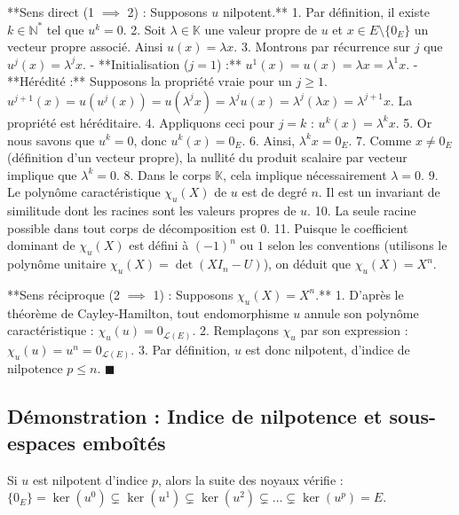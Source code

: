 \documentclass[11pt,a4paper]{article}
\begin{document}
**Sens direct (1 $\implies$ 2) : Supposons $u$ nilpotent.**
1. Par définition, il existe $k \in \mathbb{N}^*$ tel que $u^k = 0$.
2. Soit $\lambda \in \mathbb{K}$ une valeur propre de $u$ et $x \in E \setminus \{0_E\}$ un vecteur propre associé. Ainsi $u(x) = \lambda x$.
3. Montrons par récurrence sur $j$ que $u^j(x) = \lambda^j x$.
   - **Initialisation ($j=1$) :** $u^1(x) = u(x) = \lambda x = \lambda^1 x$.
   - **Hérédité :** Supposons la propriété vraie pour un $j \ge 1$. $u^{j+1}(x) = u(u^j(x)) = u(\lambda^j x) = \lambda^j u(x) = \lambda^j (\lambda x) = \lambda^{j+1} x$. La propriété est héréditaire.
4. Appliquons ceci pour $j=k$ : $u^k(x) = \lambda^k x$.
5. Or nous savons que $u^k = 0$, donc $u^k(x) = 0_E$.
6. Ainsi, $\lambda^k x = 0_E$.
7. Comme $x \neq 0_E$ (définition d'un vecteur propre), la nullité du produit scalaire par vecteur implique que $\lambda^k = 0$.
8. Dans le corps $\mathbb{K}$, cela implique nécessairement $\lambda = 0$.
9. Le polynôme caractéristique $\chi_u(X)$ de $u$ est de degré $n$. Il est un invariant de similitude dont les racines sont les valeurs propres de $u$.
10. La seule racine possible dans tout corps de décomposition est $0$.
11. Puisque le coefficient dominant de $\chi_u(X)$ est défini à $(-1)^n$ ou $1$ selon les conventions (utilisons le polynôme unitaire $\chi_u(X) = \det(XI_n - U)$), on déduit que $\chi_u(X) = X^n$.

**Sens réciproque (2 $\implies$ 1) : Supposons $\chi_u(X) = X^n$.**
1. D'après le théorème de Cayley-Hamilton, tout endomorphisme $u$ annule son polynôme caractéristique : $\chi_u(u) = 0_{\mathcal{L}(E)}$.
2. Remplaçons $\chi_u$ par son expression : $\chi_u(u) = u^n = 0_{\mathcal{L}(E)}$.
3. Par définition, $u$ est donc nilpotent, d'indice de nilpotence $p \le n$. $\blacksquare$

\subsection{Démonstration : Indice de nilpotence et sous-espaces emboîtés}

Si $u$ est nilpotent d'indice $p$, alors la suite des noyaux vérifie :
$\{0_E\} = \ker(u^0) \subsetneq \ker(u^1) \subsetneq \ker(u^2) \subsetneq \dots \subsetneq \ker(u^p) = E$.
\end{document}
